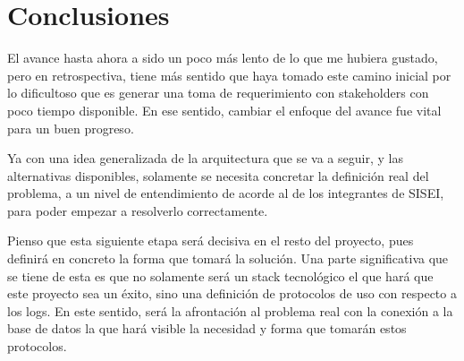 \section{Conclusiones}

El avance hasta ahora a sido un poco más lento de lo que me hubiera gustado, pero en retrospectiva, tiene más sentido que haya tomado este camino inicial por lo dificultoso que es generar una toma de requerimiento con stakeholders con poco tiempo disponible. En ese sentido, cambiar el enfoque del avance fue vital para un buen progreso.

Ya con una idea generalizada de la arquitectura que se va a seguir, y las alternativas disponibles, solamente se necesita concretar la definición real del problema, a un nivel de entendimiento de acorde al de los integrantes de SISEI, para poder empezar a resolverlo correctamente.

Pienso que esta siguiente etapa será decisiva en el resto del proyecto, pues definirá en concreto la forma que tomará la solución. Una parte significativa que se tiene de esta es que no solamente será un stack tecnológico el que hará que este proyecto sea un éxito, sino una definición de protocolos de uso con respecto a los logs. En este sentido, será la afrontación al problema real con la conexión a la base de datos la que hará visible la necesidad y forma que tomarán estos protocolos.

\clearpage
